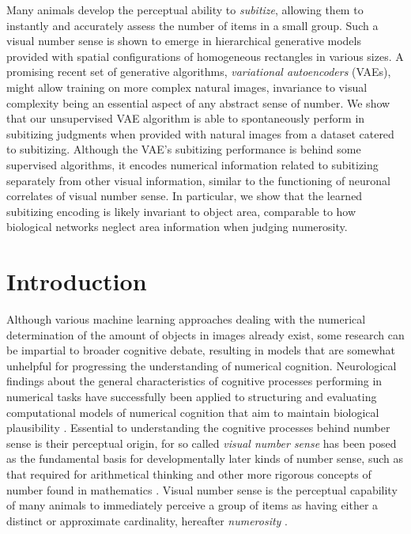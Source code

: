 \documentclass[twocolumn]{article}
\renewenvironment{abstract}
               {\list{}{\leftmargin}%
                \item[\hspace{7mm}\textbf{Abstract}]\relax}
               {\endlist}
\begin{document}
\begin{abstract}
Many animals develop the perceptual ability to \emph{subitize}, allowing them to instantly and accurately assess the number of items in a small group. Such a visual number sense is shown to emerge in hierarchical generative models provided with spatial configurations of homogeneous rectangles in various sizes. A promising recent set of generative algorithms,  \emph{variational autoencoders} (VAEs), might allow training on more complex natural images, invariance to visual complexity being an essential aspect of any abstract sense of number. We show that our unsupervised VAE algorithm is able to spontaneously perform in subitizing judgments when provided with natural images from a dataset catered to subitizing. Although the VAE's subitizing performance is behind some supervised algorithms, it encodes numerical information related to subitizing separately from other visual information, similar to the functioning of neuronal correlates of visual number sense. In particular, we show that the learned subitizing encoding is likely invariant to object area, comparable to how biological networks neglect area information when judging numerosity.
\end{abstract}

\hypertarget{introduction}{%
\section{Introduction}\label{introduction}}

Although various machine learning approaches dealing with the numerical
determination of the amount of objects in images already exist, some
research can be impartial to broader cognitive debate, resulting in
models that are somewhat unhelpful for progressing the understanding of
numerical cognition. Neurological findings about the general characteristics of cognitive processes performing in numerical tasks have successfully been applied to structuring and evaluating computational models of numerical cognition that aim to maintain biological plausibility \citep{stoianov2012, zhang2016salient}.
Essential to understanding the
cognitive processes behind number sense is their perceptual origin, for
so called \emph{visual number sense} has been posed as the fundamental
basis for developmentally later kinds of number sense, such as that
required for arithmetical thinking and other more rigorous concepts of
number found in mathematics \citetext{\citealp[ chap.
2]{lakoff}; \citealp{numerosity-basis}}. Visual number sense is the
perceptual capability of many animals to immediately perceive a group of items as
having either a distinct or approximate cardinality, hereafter \emph{numerosity} \citep{feigenson2004core}. 
\end{document}
